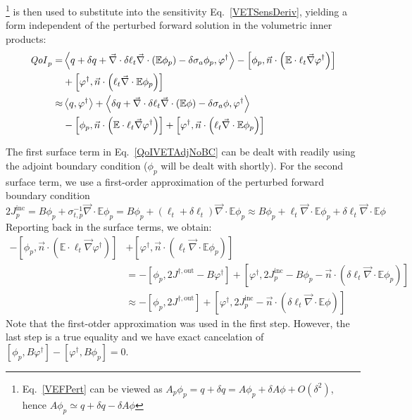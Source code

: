 \documentclass[12pt]{report}
\newcommand{\bra}{\left\langle}
\newcommand{\ket}{\right\rangle}
\newcommand{\sbra}{\left[}
\newcommand{\sket}{\right]}
\renewcommand{\div}{\vec{\nabla} \cdot}
\newcommand{\grad}{\vec{\nabla}}
\newcommand{\vefadj}{\varphi^\dag}
\newcommand{\vn}{\vec{n}}
\newcommand{\Edd}{\mathbb{E}}
\newcommand{\siga}{\sigma_a}
\newcommand{\isigt}{\ell_t}
\newcommand{\scalSource}{q}
\newcommand{\qoi}{{\it QoI}\xspace}
\begin{document}
\footnote{Eq.~\eqref{VEFPert} can be viewed as $A_p \phi_p = q+\delta q = A \phi_p + \delta A \phi + O(\delta^2)$, hence $A \phi_p  \simeq  q+\delta q -\delta A \phi$} is then used to substitute into the sensitivity Eq.~\eqref{VETSensDeriv}, yielding a form independent of the perturbed forward solution in the volumetric inner products:
\begin{equation}
\label{QoIVETAdjNoBC}
\begin{split}
\qoi_p =& \bra \scalSource + \delta \scalSource + \div \delta \isigt \div \left( \Edd \phi_p \right) - \delta \siga \phi_p, \vefadj \ket - \sbra \phi_p, \vn \cdot \left(  \Edd \cdot \isigt \grad \vefadj \right) \sket \\ 
&+ \sbra \vefadj, \vn \cdot \left(  \isigt \div \Edd \phi_p \right) \sket \\
\approx & \bra q, \vefadj \ket  + \bra \delta \scalSource + \div \delta \isigt \div \left( \Edd \phi \right)  - \delta \siga \phi, \vefadj \ket \\
& - \sbra \phi_p, \vn \cdot \left(  \Edd \cdot \isigt \grad \vefadj \right) \sket + \sbra \vefadj, \vn \cdot \left(  \isigt \div \Edd \phi_p \right) \sket \\
\end{split}
\end{equation}

The first surface term in Eq.~\eqref{QoIVETAdjNoBC} 
can be dealt with readily using the adjoint boundary condition ($\phi_p$ will be dealt with shortly). For the second surface term, we use a first-order approximation of the perturbed forward boundary condition  
\[
2 J_p^{\text{inc}} = B \phi_p + \sigma_{t,p}^{-1}\div \Edd \phi_p
= B \phi_p + (\isigt + \delta \isigt) \div \Edd \phi_p
\approx B \phi_p + \isigt  \div \Edd \phi_p + \delta \isigt  \div \Edd \phi
\]
Reporting back in the surface terms, we obtain:
\begin{equation}
\begin{split}
 - \sbra \phi_p, \vn \cdot \left( \Edd \cdot \isigt \grad \vefadj \right) \sket  &+ \sbra \vefadj, \vn \cdot \left(  \isigt \div \Edd \phi_p \right) \sket \\
&=- \sbra \phi_p, 2J^{\dag,\text{out}} - B \vefadj \sket 
+ \sbra \vefadj, 2 J_p^{\text{inc}} - B \phi_p - \vn \cdot \left( \delta \isigt \div \Edd \phi_p \right) \sket \\
&\approx- \sbra \phi_p, 2J^{\dag,\text{out}} \sket + \sbra \vefadj, 2 J_p^{\text{inc}} - \vn \cdot \left( \delta \isigt \div \Edd \phi \right) \sket  
\end{split}
\end{equation}
Note that the first-otder approximation was used in the first step. However, the last step is a true equality and we have exact cancelation of $\sbra \phi_p,B \vefadj \sket - \sbra \vefadj , B\phi_p\sket=0$.
\end{document}
